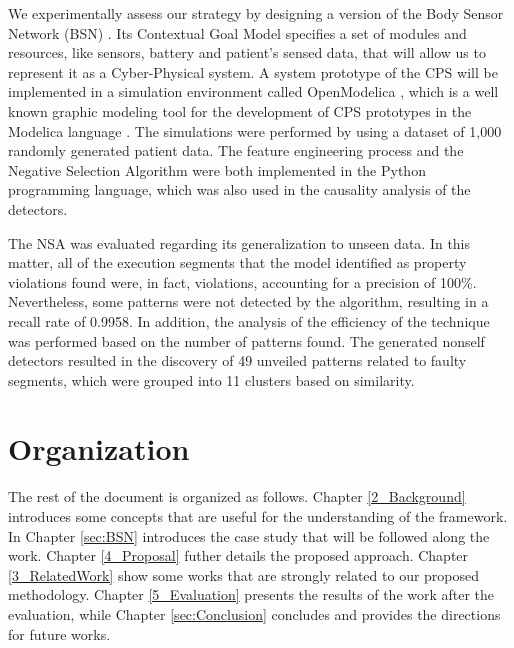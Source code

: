 We experimentally assess our strategy by designing a version of the Body Sensor Network (BSN) \cite{2021BSN}. Its Contextual Goal Model specifies a set of modules and resources, like sensors, battery and patient's sensed data, that will allow us to represent it as a Cyber-Physical system. A system prototype of the CPS will be implemented in a simulation environment called OpenModelica \cite{OpenModelica}, which is a well known graphic modeling tool for the development of CPS prototypes in the Modelica language \cite{Modelica}.
The simulations were performed by using a dataset of 1,000 randomly generated patient data. The feature engineering process and the Negative Selection Algorithm were both implemented in the Python programming language, which was also used in the causality analysis of the detectors.

The NSA was evaluated regarding its generalization to unseen data. In this matter, all of the execution segments that the model identified as property violations found were, in fact, violations, accounting for a precision of 100\%. Nevertheless, some patterns were not detected by the algorithm, resulting in a recall rate of 0.9958. In addition, the analysis of the efficiency of the technique was performed based on the number of patterns found. The generated nonself detectors resulted in the discovery of 49 unveiled patterns related to faulty segments, which were grouped into 11 clusters based on similarity. 

\section{Organization}
The rest of the document is organized as follows. Chapter \ref{2_Background} introduces some concepts that are useful for the understanding of the framework. In Chapter \ref{sec:BSN} introduces the case study that will be followed along the work. Chapter \ref{4_Proposal} futher details the proposed approach. Chapter \ref{3_RelatedWork} show some works that are strongly related to our proposed methodology. Chapter \ref{5_Evaluation} presents the results of the work after the evaluation, while Chapter \ref{sec:Conclusion} concludes and provides the directions for future works.